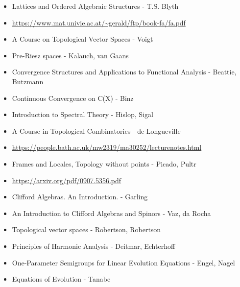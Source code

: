 \documentclass{report}
\begin{document}
\begin{itemize}
\item Lattices and Ordered Algebraic Structures - T.S. Blyth
\item \url{https://www.mat.univie.ac.at/~gerald/ftp/book-fa/fa.pdf}
\item A Course on Topological Vector Spaces - Voigt
\item Pre-Riesz spaces - Kalauch, van Gaans
\item Convergence Structures and Applications to Functional Analysis - Beattie, Butzmann
\item Continuous Convergence on C(X) - Binz
\item Introduction to Spectral Theory - Hislop, Sigal
\item A Course in Topological Combinatorics - de Longueville
\item \url{https://people.bath.ac.uk/mw2319/ma30252/lecturenotes.html}
\item Frames and Locales, Topology without points - Picado, Pultr
\item \url{https://arxiv.org/pdf/0907.5356.pdf}
\item Clifford Algebras. An Introduction. - Garling
\item An Introduction to Clifford Algebras and Spinors - Vaz, da Rocha
\item Topological vector spaces - Robertson, Robertson
\item Principles of Harmonic Analysis - Deitmar, Echterhoff
\item One-Parameter Semigroups for Linear Evolution Equations - Engel, Nagel
\item Equations of Evolution - Tanabe
\end{itemize}
\end{document}
